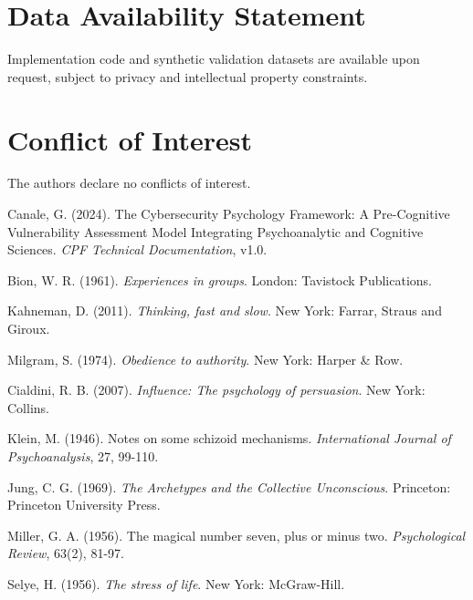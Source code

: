 \documentclass[11pt, onecolumn]{article}
\begin{document}
\section*{Data Availability Statement}

Implementation code and synthetic validation datasets are available upon request, subject to privacy and intellectual property constraints.

\section*{Conflict of Interest}

The authors declare no conflicts of interest.

\begin{thebibliography}{99}

Canale, G. (2024). The Cybersecurity Psychology Framework: A Pre-Cognitive Vulnerability Assessment Model Integrating Psychoanalytic and Cognitive Sciences. \textit{CPF Technical Documentation}, v1.0.

Bion, W. R. (1961). \textit{Experiences in groups}. London: Tavistock Publications.

Kahneman, D. (2011). \textit{Thinking, fast and slow}. New York: Farrar, Straus and Giroux.

Milgram, S. (1974). \textit{Obedience to authority}. New York: Harper \& Row.

Cialdini, R. B. (2007). \textit{Influence: The psychology of persuasion}. New York: Collins.

Klein, M. (1946). Notes on some schizoid mechanisms. \textit{International Journal of Psychoanalysis}, 27, 99-110.

Jung, C. G. (1969). \textit{The Archetypes and the Collective Unconscious}. Princeton: Princeton University Press.

Miller, G. A. (1956). The magical number seven, plus or minus two. \textit{Psychological Review}, 63(2), 81-97.

Selye, H. (1956). \textit{The stress of life}. New York: McGraw-Hill.

\end{thebibliography}
\end{document}
